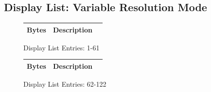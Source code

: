 %
%
\subsection*{Display List: Variable Resolution Mode}
\vspace{-0.5cm}
\begin{minipage}[b]{0.31\linewidth}
  \begin{figure}[H]
    {
      \setlength{\tabcolsep}{3.0pt}
      \setlength\cmidrulewidth{\heavyrulewidth} %
      \begin{adjustbox}{height=8.5cm}

        \begin{tabular}{lll}
          \toprule
          Bytes       & Description                                                         \\
          \midrule
          
        \end{tabular}

      \end{adjustbox}

    }\caption*{Display List Entries: 1-61}
  \end{figure}
\end{minipage}
\hspace{0.1cm}
\begin{minipage}[b]{0.31\linewidth}
  \begin{figure}[H]
    {
      \setlength{\tabcolsep}{3.0pt}
      \setlength\cmidrulewidth{\heavyrulewidth} %
      \begin{adjustbox}{height=8.5cm}

        \begin{tabular}{lll}
          \toprule
          Bytes       & Description                                                         \\
          \midrule
        \end{tabular}

      \end{adjustbox}

    }\caption*{Display List Entries: 62-122}
  \end{figure}
\end{minipage}
\hspace{0.1cm}
